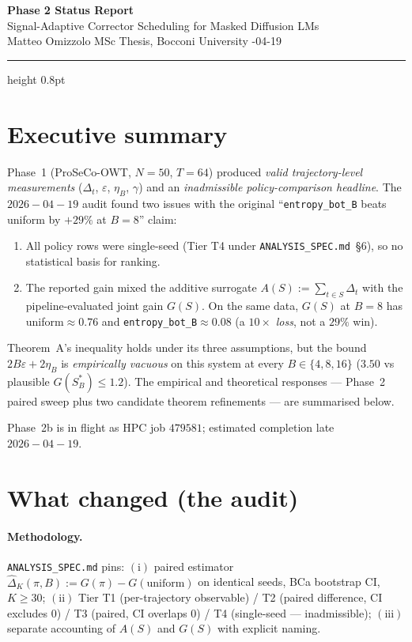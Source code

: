 \documentclass[11pt,a4paper]{article}
\newcommand{\Sopt}{S_B^{*}}
\newcommand{\eps}{\varepsilon}
\begin{document}
\begin{center}
  {\Large\bfseries Phase 2 Status Report}\\[2pt]
  {\small Signal-Adaptive Corrector Scheduling for Masked Diffusion LMs}\\[2pt]
  {\small Matteo Omizzolo \quad MSc Thesis, Bocconi University -04-19}
\end{center}

\hrule height 0.8pt
\bigskip

\section*{Executive summary}

Phase~1 (ProSeCo-OWT, $N{=}50$, $T{=}64$) produced \emph{valid trajectory-level
measurements} ($\Delta_t$, $\eps$, $\eta_B$, $\gamma$) and an \emph{inadmissible
policy-comparison headline}. The $2026{-}04{-}19$ audit found two issues with
the original ``\texttt{entropy\_bot\_B} beats uniform by $+29\%$ at $B{=}8$'' claim:

\begin{enumerate}[leftmargin=1.4em]
  \item All policy rows were single-seed (Tier T4 under
    \texttt{ANALYSIS\_SPEC.md}~\S6), so no statistical basis for ranking.
  \item The reported gain mixed the additive surrogate $A(S){:=}\sum_{t\in S}\Delta_t$
    with the pipeline-evaluated joint gain $G(S)$. On the same data, $G(S)$ at
    $B{=}8$ has uniform${\approx}0.76$ and \texttt{entropy\_bot\_B}${\approx}0.08$
    (a $10{\times}$ \emph{loss}, not a $29\%$ win).
\end{enumerate}

Theorem~A's inequality holds under its three assumptions, but the bound
$2B\eps + 2\eta_B$ is \emph{empirically vacuous} on this system at every
$B{\in}\{4,8,16\}$ ($3.50$ vs plausible $G(\Sopt)\le 1.2$). The empirical and
theoretical responses --- Phase~2 paired sweep plus two candidate theorem
refinements --- are summarised below.

Phase~2b is in flight as HPC job $479581$; estimated completion late
$2026{-}04{-}19$.

\section{What changed (the audit)}

\paragraph{Methodology.} \texttt{ANALYSIS\_SPEC.md} pins:
$(\mathrm{i})$ paired estimator $\widehat{\Delta}_K(\pi, B) := G(\pi) - G(\text{uniform})$
on identical seeds, BCa bootstrap CI, $K{\geq}30$;
$(\mathrm{ii})$ Tier T1 (per-trajectory observable) / T2 (paired difference, CI
excludes 0) / T3 (paired, CI overlaps 0) / T4 (single-seed --- inadmissible);
$(\mathrm{iii})$ separate accounting of $A(S)$ and $G(S)$ with explicit naming.
\end{document}
